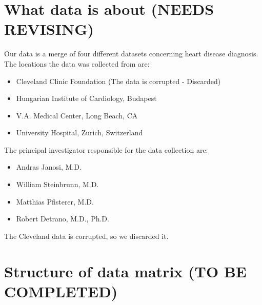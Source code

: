 \documentclass[a4paper,12pt]{article}
\begin{document}
\section{What data is about (\textbf{NEEDS REVISING})}

    Our data is a merge of four different datasets concerning heart disease diagnosis. The locations the data was collected from are:

    \begin{itemize}

        \item Cleveland Clinic Foundation (The data is corrupted - Discarded)
        \item Hungarian Institute of Cardiology, Budapest
        \item V.A. Medical Center, Long Beach, CA
        \item University Hospital, Zurich, Switzerland

    \end{itemize}

    The principal investigator responsible for the data collection are:

    \begin{itemize}

        \item Andras Janosi, M.D.
        \item William Steinbrunn, M.D.
        \item Matthias Pfisterer, M.D.
        \item Robert Detrano, M.D., Ph.D.

    \end{itemize}

    The Cleveland data is corrupted, so we discarded it.

\section{Structure of data matrix (\textbf{TO BE COMPLETED})}
\end{document}
